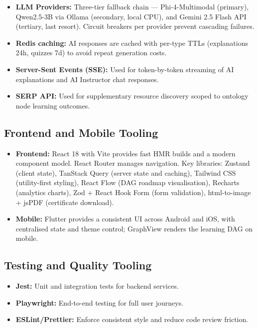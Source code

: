 \begin{itemize}
    \item \textbf{LLM Providers:} Three-tier fallback chain --- Phi-4-Multimodal (primary), Qwen2.5-3B via Ollama (secondary, local CPU), and Gemini 2.5 Flash API (tertiary, last resort). Circuit breakers per provider prevent cascading failures.
    \item \textbf{Redis caching:} AI responses are cached with per-type TTLs (explanations 24h, quizzes 7d) to avoid repeat generation costs.
    \item \textbf{Server-Sent Events (SSE):} Used for token-by-token streaming of AI explanations and AI Instructor chat responses.
    \item \textbf{SERP API:} Used for supplementary resource discovery scoped to ontology node learning outcomes.
\end{itemize}

\subsection{Frontend and Mobile Tooling}

\begin{itemize}
    \item \textbf{Frontend:} React 18 with Vite provides fast HMR builds and a modern component model. React Router manages navigation. Key libraries: Zustand (client state), TanStack Query (server state and caching), Tailwind CSS (utility-first styling), React Flow (DAG roadmap visualisation), Recharts (analytics charts), Zod + React Hook Form (form validation), html-to-image + jsPDF (certificate download).
    \item \textbf{Mobile:} Flutter provides a consistent UI across Android and iOS, with centralised state and theme control; GraphView renders the learning DAG on mobile.
\end{itemize}

\subsection{Testing and Quality Tooling}

\begin{itemize}
    \item \textbf{Jest:} Unit and integration tests for backend services.
    \item \textbf{Playwright:} End-to-end testing for full user journeys.
    \item \textbf{ESLint/Prettier:} Enforce consistent style and reduce code review friction.
\end{itemize}

